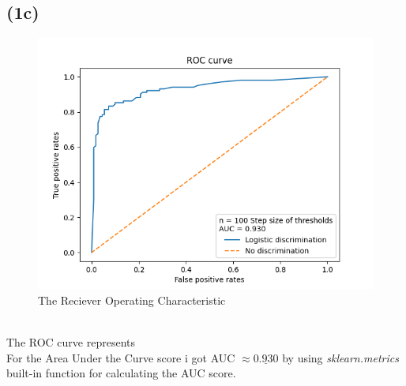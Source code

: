 \documentclass[12pt, letterpaper]{article}
\begin{document}
    \subsection*{(1c)}
    \begin{figure}[h]
      \caption{The Reciever Operating Characteristic}
      \centering
      \includegraphics[width=14cm]{ROC}
    \end{figure}\\
    The ROC curve represents\\

    For the Area Under the Curve score i got AUC $ \approx \underline{0.930}$ by using \textit{sklearn.metrics} built-in function for calculating the AUC score.
\end{document}
